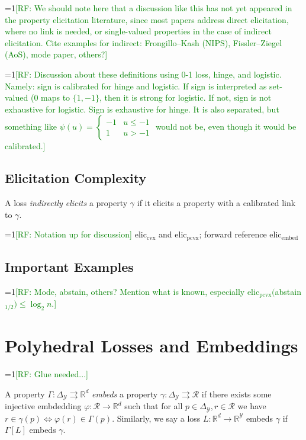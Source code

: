 \documentclass[anon,12pt]{colt2019}
\newcommand{\Comments}{1}
\newcommand{\mynote}[2]{\ifnum\Comments=1\textcolor{#1}{#2}\fi}
\newcommand{\raf}[1]{\mynote{green}{[RF: #1]}}
\newcommand{\reals}{\mathbb{R}}
\newcommand{\prop}[1]{\Gamma[#1]}
\newcommand{\eliccvx}{\mathrm{elic}_\mathrm{cvx}}
\newcommand{\elicpoly}{\mathrm{elic}_\mathrm{pcvx}}
\newcommand{\elicembed}{\mathrm{elic}_\mathrm{embed}}
\newcommand{\simplex}{\Delta_\Y}
\newcommand{\R}{\mathcal{R}}
\newcommand{\Y}{\mathcal{Y}}
\newcommand{\toto}{\rightrightarrows}
\begin{document}
\raf{We should note here that a discussion like this has not yet appeared in the property elicitation literature, since most papers address direct elicitation, where no link is needed, or single-valued properties in the case of indirect elicitation.  Cite examples for indirect: Frongillo--Kash (NIPS), Fissler--Ziegel (AoS), mode paper, others?}

\raf{Discussion about these definitions using 0-1 loss, hinge, and logistic.  Namely: sign is calibrated for hinge and logistic.  If sign is interpreted as set-valued (0 maps to $\{1,-1\}$, then it is strong for logistic.  If not, sign is not exhaustive for logistic.  Sign is exhaustive for hinge.  It is also separated, but something like $\psi(u) =
  \begin{cases}
    -1 & u \leq -1\\
    1 & u > -1
  \end{cases}$
  would not be, even though it would be calibrated.}


\subsection{Elicitation Complexity}

\begin{definition}
  A loss \emph{indirectly elicits} a property $\gamma$ if it elicits a property with a calibrated link to $\gamma$.
\end{definition}

\raf{Notation up for discussion}
$\eliccvx$ and $\elicpoly$; forward reference $\elicembed$

\subsection{Important Examples}
\raf{Mode, abstain, others?  Mention what is known, especially $\elicpoly($abstain$_{1/2}) \leq \log_2 n$.}

\section{Polyhedral Losses and Embeddings}

\raf{Glue needed...}
\begin{definition}
  A property $\Gamma : \simplex \toto \reals^d$ \emph{embeds} a property $\gamma : \simplex \toto \R$ if there exists some injective embdedding $\varphi:\R\to\reals^d$ such that for all $p\in\simplex,r\in\R$ we have $r \in \gamma(p) \iff \varphi(r) \in \Gamma(p)$.
  Similarly, we say a loss $L:\reals^d\to\reals^\Y$ embeds $\gamma$ if $\prop{L}$ embeds $\gamma$.
\end{definition}
\end{document}
